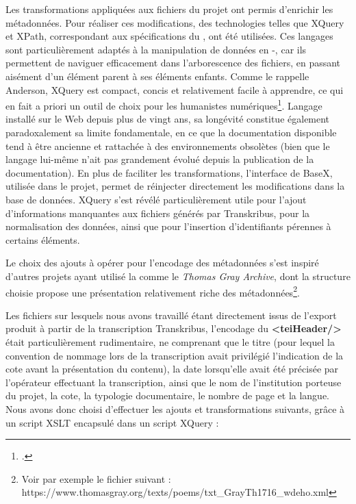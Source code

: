 Les transformations appliquées aux fichiers \tei du projet \pense ont permis d’enrichir les métadonnées. Pour réaliser ces modifications, des technologies telles que XQuery et XPath, correspondant aux spécifications du \wwwc, ont été utilisées. Ces langages sont particulièrement adaptés à la manipulation de données en \xml-\tei, car ils permettent de naviguer efficacement dans l’arborescence des fichiers, en passant aisément d’un élément parent à ses éléments enfants. Comme le rappelle Anderson, XQuery est compact, concis et relativement facile à apprendre, ce qui en fait a priori un outil de choix pour les humanistes numériques\footcite{anderson_teaching_nodate}. 
Langage installé sur le Web depuis plus de vingt ans, sa longévité constitue également paradoxalement sa limite fondamentale, en ce que la documentation disponible tend à être ancienne et rattachée à des environnements obsolètes (bien que le langage lui-même n’ait pas grandement évolué depuis la publication de la documentation).  En plus de faciliter les transformations, l’interface de BaseX, utilisée dans le projet, permet de réinjecter directement les modifications dans la base de données.
XQuery s’est révélé particulièrement utile pour l’ajout d’informations manquantes aux fichiers \tei générés par Transkribus, pour la normalisation des données, ainsi que pour l’insertion d’identifiants pérennes à certains éléments.

Le choix des ajouts à opérer pour l’encodage des métadonnées s’est inspiré d’autres projets ayant utilisé la \tei comme le \textit{Thomas Gray Archive}, dont la structure \tei choisie propose une présentation relativement riche des métadonnées\footnote{Voir par exemple le fichier suivant : https://www.thomasgray.org/texts/poems/txt_GrayTh1716_wdeho.xml}.

Les fichiers sur lesquels nous avons travaillé étant directement issus de l’export \tei produit à partir de la transcription Transkribus, l’encodage du \textbf{<teiHeader/>} était particulièrement rudimentaire, ne comprenant que le titre (pour lequel la convention de nommage lors de la transcription avait privilégié l’indication de la cote avant la présentation du contenu), la date lorsqu’elle avait été précisée par l’opérateur effectuant la transcription, ainsi que le nom de l’institution porteuse du projet, la cote, la typologie documentaire, le nombre de page et la langue. 
Nous avons donc choisi d’effectuer les ajouts et transformations suivants, grâce à un script XSLT encapsulé dans un script XQuery  :

